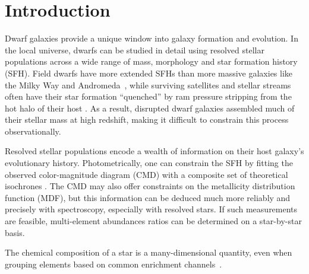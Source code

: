 \documentclass[ms.tex]{subfiles}
\begin{document}
\section{Introduction}
\label{sec:intro}

Dwarf galaxies provide a unique window into galaxy formation and evolution.
In the local universe, dwarfs can be studied in detail using resolved stellar
populations across a wide range of mass, morphology and star formation history
(SFH).
Field dwarfs have more extended SFHs than more massive galaxies like the Milky
Way and Andromeda~\citep[e.g.,][]{Behroozi2019, GarrisonKimmel2019}, while
surviving satellites and stellar streams often have their star formation
``quenched'' by ram pressure stripping from the hot halo of their host
\citep*[see discussion in, e.g.,][]{Steyrleithner2020}.
As a result, disrupted dwarf galaxies assembled much of their stellar mass at
high redshift, making it difficult to constrain this process observationally.
\par
Resolved stellar populations encode a wealth of information on their host
galaxy's evolutionary history.
Photometrically, one can constrain the SFH by fitting the observed
color-magnitude diagram (CMD) with a composite set of theoretical isochrones
\citep[e.g.,][]{Dolphin2002}.
The CMD may also offer constraints on the metallicity distribution function
(MDF), but this information can be deduced much more reliably and precisely
with spectroscopy, especially with resolved stars.
If such measurements are feasible, multi-element abundances ratios can be
determined on a star-by-star basis.
\par
The chemical composition of a star is a many-dimensional quantity, even when
grouping elements based on common enrichment channels~\citep{Ting2022}.
\end{document}
